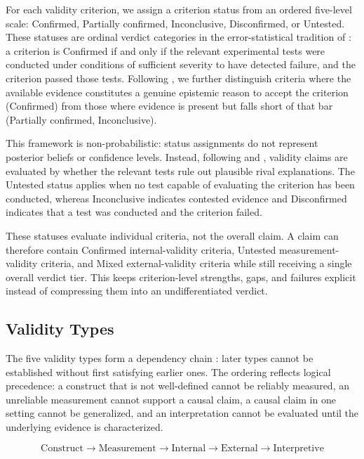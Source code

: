 \documentclass{article}
\begin{document}
For each validity criterion, we assign a criterion status from an ordered five-level scale: Confirmed, Partially confirmed, Inconclusive, Disconfirmed, or Untested. These statuses are ordinal verdict categories in the error-statistical tradition of \citet{mayo1996error, mayo2018statistical}: a criterion is Confirmed if and only if the relevant experimental tests were conducted under conditions of sufficient severity to have detected failure, and the criterion passed those tests. Following \citet{achinstein2001book}, we further distinguish criteria where the available evidence constitutes a genuine epistemic reason to accept the criterion (Confirmed) from those where evidence is present but falls short of that bar (Partially confirmed, Inconclusive).

This framework is non-probabilistic: status assignments do not represent posterior beliefs or confidence levels. Instead, following \citet{campbell1963experimental} and \citet{cook1979quasi}, validity claims are evaluated by whether the relevant tests rule out plausible rival explanations. The Untested status applies when no test capable of evaluating the criterion has been conducted, whereas Inconclusive indicates contested evidence and Disconfirmed indicates that a test was conducted and the criterion failed.


These statuses evaluate individual criteria, not the overall claim. A claim can therefore contain Confirmed internal-validity criteria, Untested measurement-validity criteria, and Mixed external-validity criteria while still receiving a single overall verdict tier. This keeps criterion-level strengths, gaps, and failures explicit instead of compressing them into an undifferentiated verdict.

\subsection{Validity Types}
\label{sec:validity-types}

The five validity types form a dependency chain \citep{shadish2002experimental}: later types cannot be established without first satisfying earlier ones. The ordering reflects logical precedence: a construct that is not well-defined cannot be reliably measured, an unreliable measurement cannot support a causal claim, a causal claim in one setting cannot be generalized, and an interpretation cannot be evaluated until the underlying evidence is characterized.

\begin{equation}
\text{Construct} \rightarrow \text{Measurement} \rightarrow \text{Internal} \rightarrow \text{External} \rightarrow \text{Interpretive}
\label{eq:dependency}
\end{equation}
\end{document}
